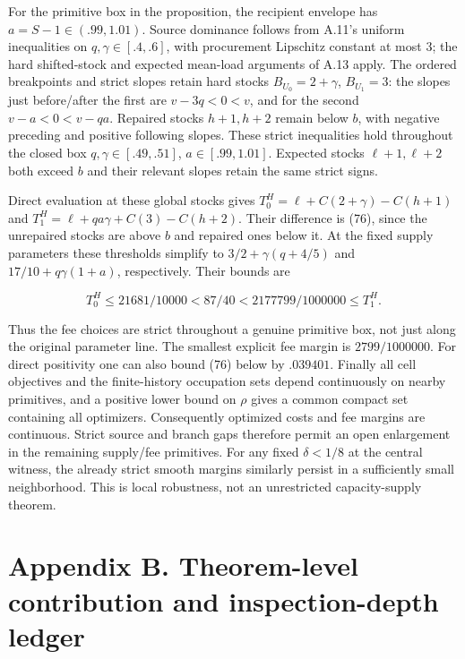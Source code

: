 \documentclass[
  11pt,
  a4paper,
]{article}
\begin{document}
For the primitive box in the proposition, the recipient envelope has
\(a=S-1\in(.99,1.01)\). Source dominance follows from A.11's uniform
inequalities on \(q,\gamma\in[.4,.6]\), with procurement Lipschitz
constant at most 3; the hard shifted-stock and expected mean-load
arguments of A.13 apply. The ordered breakpoints and strict slopes
retain hard stocks \(B_{U_0}=2+\gamma\), \(B_{U_1}=3\): the slopes just
before/after the first are \(v-3q<0<v\), and for the second
\(v-a<0<v-qa\). Repaired stocks \(h+1,h+2\) remain below \(b\), with
negative preceding and positive following slopes. These strict
inequalities hold throughout the closed box \(q,\gamma\in[.49,.51]\),
\(a\in[.99,1.01]\). Expected stocks \(\ell+1,\ell+2\) both exceed \(b\)
and their relevant slopes retain the same strict signs.

Direct evaluation at these global stocks gives
\(T^H_0=\ell+C(2+\gamma)-C(h+1)\) and
\(T^H_1=\ell+qa\gamma+C(3)-C(h+2)\). Their difference is (76), since the
unrepaired stocks are above \(b\) and repaired ones below it. At the
fixed supply parameters these thresholds simplify to
\(3/2+\gamma(q+4/5)\) and \(17/10+q\gamma(1+a)\), respectively. Their
bounds are

\[T^H_0\leq21681/10000<87/40<2177799/1000000\leq T^H_1.\tag{79}\]

Thus the fee choices are strict throughout a genuine primitive box, not
just along the original parameter line. The smallest explicit fee margin
is \(2799/1000000\). For direct positivity one can also bound (76) below
by \(.039401\). Finally all cell objectives and the finite-history
occupation sets depend continuously on nearby primitives, and a positive
lower bound on \(\rho\) gives a common compact set containing all
optimizers. Consequently optimized costs and fee margins are continuous.
Strict source and branch gaps therefore permit an open enlargement in
the remaining supply/fee primitives. For any fixed \(\delta<1/8\) at the
central witness, the already strict smooth margins similarly persist in
a sufficiently small neighborhood. This is local robustness, not an
unrestricted capacity-supply theorem.

\hypertarget{appendix-b.-theorem-level-contribution-and-inspection-depth-ledger}{%
\section{Appendix B. Theorem-level contribution and inspection-depth
ledger}\label{appendix-b.-theorem-level-contribution-and-inspection-depth-ledger}}
\end{document}

